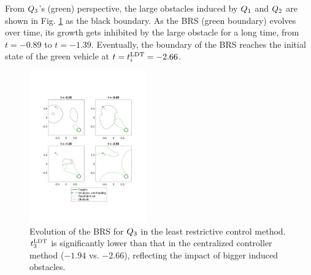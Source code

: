 From $Q_3$'s (green) perspective, the large obstacles induced by $Q_1$ and $Q_2$ are shown in Fig. \ref{fig:lrc_rs3} as the black boundary. As the BRS (green boundary) evolves over time, its growth gets inhibited by the large obstacle for a long time, from $t=-0.89$ to $t=-1.39$. Eventually, the boundary of the BRS reaches the initial state of the green vehicle at $t = t^\text{LDT}_i = -2.66$.

\begin{figure}[h]
  \centering
  \includegraphics[width=0.45\textwidth]{"fig/lrc_rs3"}
  \caption{Evolution of the BRS for $Q_3$ in the least restrictive control method. $t^\text{LDT}_3$ is significantly lower than that in the centralized controller method ($-1.94$ vs. $-2.66$), reflecting the impact of bigger induced obstacles.}
  \label{fig:lrc_rs3}
\end{figure}